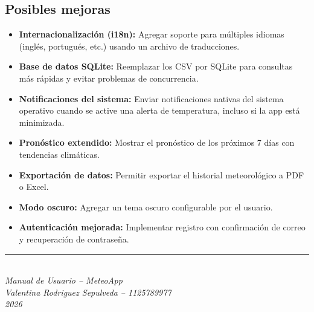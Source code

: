 \documentclass[12pt,a4paper]{article}
\begin{document}
\subsection{Posibles mejoras}
\begin{itemize}
    \item \textbf{Internacionalización (i18n):} Agregar soporte para múltiples idiomas (inglés, portugués, etc.) usando un archivo de traducciones.
    \item \textbf{Base de datos SQLite:} Reemplazar los CSV por SQLite para consultas más rápidas y evitar problemas de concurrencia.
    \item \textbf{Notificaciones del sistema:} Enviar notificaciones nativas del sistema operativo cuando se active una alerta de temperatura, incluso si la app está minimizada.
    \item \textbf{Pronóstico extendido:} Mostrar el pronóstico de los próximos 7 días con tendencias climáticas.
    \item \textbf{Exportación de datos:} Permitir exportar el historial meteorológico a PDF o Excel.
    \item \textbf{Modo oscuro:} Agregar un tema oscuro configurable por el usuario.
    \item \textbf{Autenticación mejorada:} Implementar registro con confirmación de correo y recuperación de contraseña.
\end{itemize}
\vfill
\begin{center}
\rule{0.5\textwidth}{0.4pt}\\[0.3cm]
\textit{Manual de Usuario -- MeteoApp}\\[0.1cm]
\textit{Valentina Rodriguez Sepulveda -- 1125789977}\\[0.1cm]
\textit{2026}
\end{center}
\end{document}
